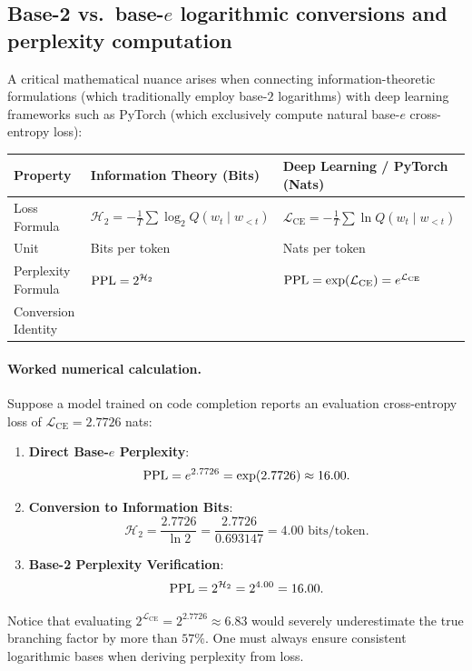 \documentclass[../../main.tex]{subfiles}
\begin{document}
\subsection{Base-2 vs.~base-$e$ logarithmic conversions and perplexity computation}
\label{subsec:log_base_conversions}

A critical mathematical nuance arises when connecting information-theoretic formulations (which traditionally employ base-$2$ logarithms) with deep learning frameworks such as PyTorch (which exclusively compute natural base-$e$ cross-entropy loss):
\begin{center}
\begin{tabularx}{\linewidth}{l >{\raggedright\arraybackslash}X >{\raggedright\arraybackslash}X}
\toprule
\textbf{Property} & \textbf{Information Theory (Bits)} & \textbf{Deep Learning / PyTorch (Nats)} \\
\midrule
Loss Formula & $\mathcal{H}_2 = -\frac{1}{T} \sum \log_2 Q(w_t \mid w_{<t})$ & $\mathcal{L}_{\text{CE}} = -\frac{1}{T} \sum \ln Q(w_t \mid w_{<t})$ \\
Unit & Bits per token & Nats per token \\
Perplexity Formula & $\mathrm{PPL} = 2^{\mathcal{H}_2}$ & $\mathrm{PPL} = \exp(\mathcal{L}_{\text{CE}}) = e^{\mathcal{L}_{\text{CE}}}$ \\
Conversion Identity & \multicolumn{2}{c}{$\mathcal{H}_2 = \frac{\mathcal{L}_{\text{CE}}}{\ln 2} \approx \frac{\mathcal{L}_{\text{CE}}}{0.693147}, \quad \mathcal{L}_{\text{CE}} = \mathcal{H}_2 \cdot \ln 2 \approx 0.693147 \cdot \mathcal{H}_2$} \\
\bottomrule
\end{tabularx}
\end{center}

\paragraph{Worked numerical calculation.}
Suppose a model trained on code completion reports an evaluation cross-entropy loss of $\mathcal{L}_{\text{CE}} = 2.7726$ nats:
\begin{enumerate}
    \item \textbf{Direct Base-$e$ Perplexity}:
    \[
    \mathrm{PPL} = e^{2.7726} = \exp(2.7726) \approx 16.00.
    \]
    \item \textbf{Conversion to Information Bits}:
    \[
    \mathcal{H}_2 = \frac{2.7726}{\ln 2} = \frac{2.7726}{0.693147} = 4.00 \text{ bits/token}.
    \]
    \item \textbf{Base-2 Perplexity Verification}:
    \[
    \mathrm{PPL} = 2^{\mathcal{H}_2} = 2^{4.00} = 16.00.
    \]
\end{enumerate}
Notice that evaluating $2^{\mathcal{L}_{\text{CE}}} = 2^{2.7726} \approx 6.83$ would severely underestimate the true branching factor by more than $57\%$. One must always ensure consistent logarithmic bases when deriving perplexity from loss.
\end{document}
